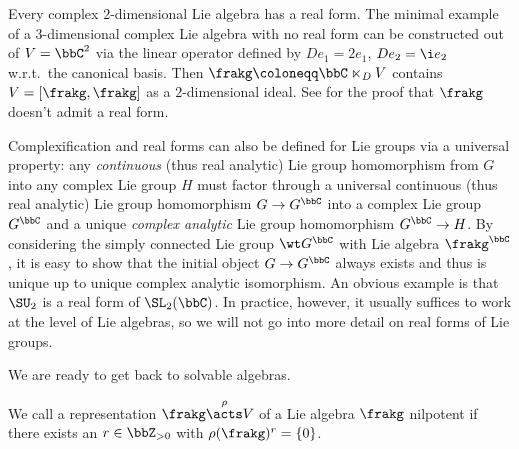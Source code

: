 \begin{example}
    Every complex $2$-dimensional Lie algebra has a real form. The minimal example of a $3$-dimensional complex Lie algebra with no real form can be constructed out of $V=\bbC^2$ via the linear operator defined by $De_1=2e_1$, $De_2=\i e_2$ w.r.t.\ the canonical basis. Then $\frakg\coloneqq \bbC\ltimes_D V$ contains $V=[\frakg,\frakg]$ as a $2$-dimensional ideal. See \cite[Example~5.1.24]{HN} for the proof that $\frakg$ doesn't admit a real form.
\end{example}

\begin{rem}
    Complexification and real forms can also be defined for Lie groups via a universal property: any \emph{continuous} (thus real analytic) Lie group homomorphism from $G$ into any complex Lie group $H$ must factor through a universal continuous (thus real analytic) Lie group homomorphism $G\to G^\bbC$ into a complex Lie group $G^\bbC$ and a unique \emph{complex analytic} Lie group homomorphism $G^\bbC\to H$. By considering the simply connected Lie group $\wt G^\bbC$ with Lie algebra $\frakg^\bbC$, it is easy to show that the initial object $G\to G^\bbC$ always exists and thus is unique up to unique complex analytic isomorphism. An obvious example is that $\SU_2$ is a real form of $\SL_2(\bbC)$. In practice, however, it usually suffices to work at the level of Lie algebras, so we will not go into more detail on real forms of Lie groups.
\end{rem}

We are ready to get back to solvable algebras.

\begin{defn}
    We call a representation $\frakg\overset{\rho}{\acts} V$ of a Lie algebra $\frakg$ nilpotent if there exists an $r\in\bbZ_{>0}$ with $\rho(\frakg)^r=\{0\}$.
\end{defn}

